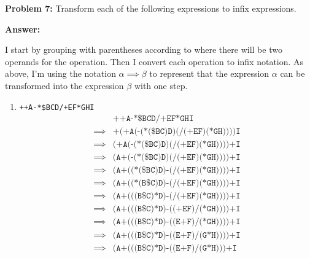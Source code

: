 \documentclass[12pt,letterpaper,final]{report}
\begin{document}
\pagebreak
\noindent\textbf{Problem 7:}
Transform each of the following expressions to infix expressions.

\noindent\textbf{Answer:}

I start by grouping with parentheses according to where there will be two operands for the operation.
Then I convert each operation to infix notation.
As above, I'm using the notation $\alpha \implies \beta$ to represent that the expression $\alpha$ can be transformed into the expression $\beta$ with one step.

\begin{enumerate}
  \item \texttt{++A-*\$BCD/+EF*GHI}
        \begin{align*}
                   & \texttt{++A-*\$BCD/+EF*GHI}                                         \\
          \implies & \texttt{+(+A(-(*(\$BC)D)(/(+EF)(*GH))))I}                           \\
          \implies & \boxed{\texttt{(+A(-(*(\$BC)D)(/(+EF)(*GH))))+I}}                   \\
          \implies & \texttt{(}\boxed{\texttt{A+}}\texttt{(-(*(\$BC)D)(/(+EF)(*GH))))+I} \\
          \implies & \texttt{(A+(}\boxed{\texttt{(*(\$BC)D)-(/(+EF)(*GH))}}\texttt{))+I} \\
          \implies & \texttt{(A+((*}\boxed{\texttt{(B\$C)}}\texttt{D)-(/(+EF)(*GH))))+I} \\
          \implies & \texttt{(A+(}\boxed{\texttt{((B\$C)*D)}}\texttt{-(/(+EF)(*GH))))+I} \\
          \implies & \texttt{(A+(((B\$C)*D)-}\boxed{\texttt{((+EF)/(*GH))}}\texttt{))+I} \\
          \implies & \texttt{(A+(((B\$C)*D)-(}\boxed{\texttt{(E+F)}}\texttt{/(*GH))))+I} \\
          \implies & \texttt{(A+(((B\$C)*D)-((E+F)/}\boxed{\texttt{(G*H)}}\texttt{)))+I} \\
          \implies & \texttt{(A+(((B\$C)*D)-((E+F)/(G*H)))+I}
        \end{align*}


\end{enumerate}
\end{document}
